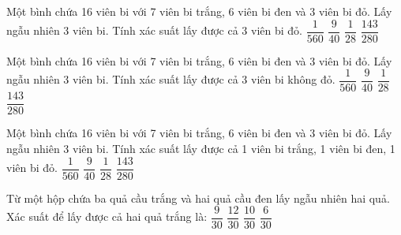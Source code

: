 \begin{ex}
Một bình chứa 16 viên bi với 7 viên bi trắng, 6 viên bi đen và 3 viên bi đỏ. Lấy ngẫu nhiên 3 viên bi. Tính xác suất lấy được cả 3 viên bi đỏ.
\choice
{\True $\dfrac{1}{560}$}
{$\dfrac{9}{40}$}
{$\dfrac{1}{28}$}
{$\dfrac{143}{280}$}
\end{ex}
\begin{ex}
Một bình chứa 16 viên bi với 7 viên bi trắng, 6 viên bi đen và 3 viên bi đỏ. Lấy ngẫu nhiên 3 viên bi. Tính xác suất lấy được cả 3 viên bi không đỏ.
\choice
{$\dfrac{1}{560}$}
{$\dfrac{9}{40}$}
{$\dfrac{1}{28}$}
{\True $\dfrac{143}{280}$}
\end{ex}
\begin{ex}
Một bình chứa 16 viên bi với 7 viên bi trắng, 6 viên bi đen và 3 viên bi đỏ. Lấy ngẫu nhiên 3 viên bi. Tính xác suất lấy được cả 1 viên bi trắng, 1 viên bi đen, 1 viên bi đỏ.
\choice
{$\dfrac{1}{560}$}
{\True $\dfrac{9}{40}$}
{$\dfrac{1}{28}$}
{$\dfrac{143}{280}$}
\end{ex}
\begin{ex}
Từ một hộp chứa ba quả cầu trắng và hai quả cầu đen lấy ngẫu nhiên hai quả. Xác suất để lấy được cả hai quả trắng là:
\choice
{\True $\dfrac{9}{30}$}
{$\dfrac{12}{30}$}
{$\dfrac{10}{30}$}
{$\dfrac{6}{30}$}
\end{ex}
